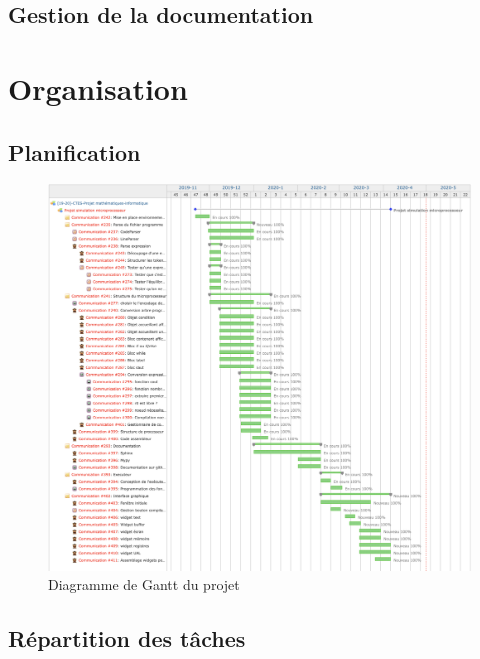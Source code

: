 \documentclass[10pt]{scrreprt} %
\begin{document}
\subsection{Gestion de la documentation}

\section{Organisation}
\subsection{Planification}

\begin{figure}[h!]
	\includegraphics[width=\textwidth]{./Pictures/Gantt.png}
	\caption{Diagramme de Gantt du projet}
\end{figure}

\subsection{Répartition des tâches}
\begin{appendix}
	\listoffigures
	\listoftables
\end{appendix}
\end{document}
